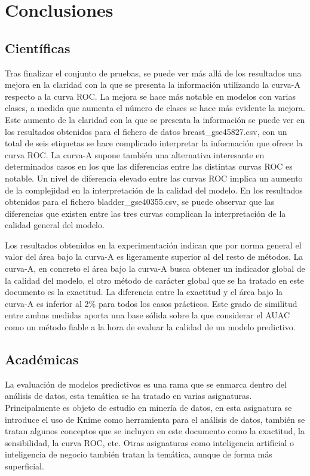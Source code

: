 \section{Conclusiones}

\subsection{Científicas}

Tras finalizar el conjunto de pruebas, se puede ver más allá de los resultados una mejora en la claridad con la que se presenta la información utilizando la curva-A respecto a la curva ROC. La mejora se hace más notable en modelos con varias clases, a medida que aumenta el número de clases se hace más evidente la mejora. Este aumento de la claridad con la que se presenta la información se puede ver en los resultados obtenidos para el fichero de datos breast\_gse45827.csv, con un total de seis etiquetas se hace complicado interpretar la información que ofrece la curva ROC. La curva-A supone también una alternativa interesante en determinados casos en los que las diferencias entre las distintas curvas ROC es notable. Un nivel de diferencia elevado entre las curvas ROC implica un aumento de la complejidad en la interpretación de la calidad del modelo. En los resultados obtenidos para el fichero bladder\_gse40355.csv, se puede observar que las diferencias que existen entre las tres curvas complican la interpretación de la calidad general del modelo.

\bigbreak

Los resultados obtenidos en la experimentación indican que por norma general el valor del área bajo la curva-A es ligeramente superior al del resto de métodos. La curva-A, en concreto el área bajo la curva-A busca obtener un indicador global de la calidad del modelo, el otro método de carácter global que se ha tratado en este documento es la exactitud. La diferencia entre la exactitud y el área bajo la curva-A es inferior al 2\% para todos los casos prácticos. Este grado de similitud entre ambas medidas aporta una base sólida sobre la que considerar el AUAC como un método fiable a la hora de evaluar la calidad de un modelo predictivo.

\subsection{Académicas}

La evaluación de modelos predictivos es una rama que se enmarca dentro del análisis de datos, esta temática se ha tratado en varias asignaturas. Principalmente es objeto de estudio en minería de datos, en esta asignatura se introduce el uso de Knime como herramienta para el análisis de datos, también se tratan algunos conceptos que se incluyen en este documento como la exactitud, la sensibilidad, la curva ROC, etc. Otras asignaturas como inteligencia artificial o inteligencia de negocio también tratan la temática, aunque de forma más superficial.

